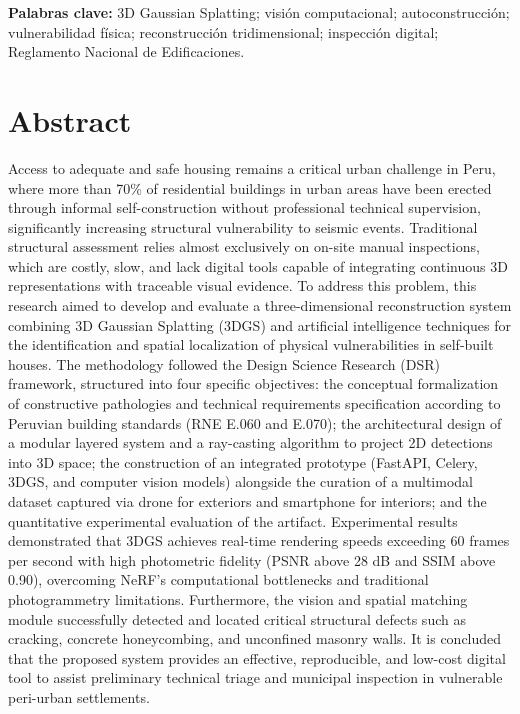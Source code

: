 \documentclass[12pt,oneside]{report}
\begin{document}
\textbf{Palabras clave:} 3D Gaussian Splatting; visión computacional; autoconstrucción; vulnerabilidad física; reconstrucción tridimensional; inspección digital; Reglamento Nacional de Edificaciones.

\chapter*{Abstract}
Access to adequate and safe housing remains a critical urban challenge in Peru, where more than 70\% of residential buildings in urban areas have been erected through informal self-construction without professional technical supervision, significantly increasing structural vulnerability to seismic events. Traditional structural assessment relies almost exclusively on on-site manual inspections, which are costly, slow, and lack digital tools capable of integrating continuous 3D representations with traceable visual evidence. To address this problem, this research aimed to develop and evaluate a three-dimensional reconstruction system combining 3D Gaussian Splatting (3DGS) and artificial intelligence techniques for the identification and spatial localization of physical vulnerabilities in self-built houses. The methodology followed the Design Science Research (DSR) framework, structured into four specific objectives: the conceptual formalization of constructive pathologies and technical requirements specification according to Peruvian building standards (RNE E.060 and E.070); the architectural design of a modular layered system and a ray-casting algorithm to project 2D detections into 3D space; the construction of an integrated prototype (FastAPI, Celery, 3DGS, and computer vision models) alongside the curation of a multimodal dataset captured via drone for exteriors and smartphone for interiors; and the quantitative experimental evaluation of the artifact. Experimental results demonstrated that 3DGS achieves real-time rendering speeds exceeding 60 frames per second with high photometric fidelity (PSNR above 28 dB and SSIM above 0.90), overcoming NeRF's computational bottlenecks and traditional photogrammetry limitations. Furthermore, the vision and spatial matching module successfully detected and located critical structural defects such as cracking, concrete honeycombing, and unconfined masonry walls. It is concluded that the proposed system provides an effective, reproducible, and low-cost digital tool to assist preliminary technical triage and municipal inspection in vulnerable peri-urban settlements.
\end{document}

